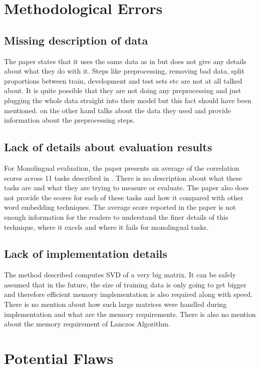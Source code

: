 \documentclass[11pt]{article}
\begin{document}
\section{Methodological Errors}
\subsection{Missing description of data} \label{missingdata}
The paper states that it uses the same data as in \cite{faruqui2014improving} but does not give any details about what they do with it. Steps like preprocessing, removing bad data, split proportions between train, development and test sets etc are not at all talked about. It is quite possible that they are not doing any preprocessing and just plugging the whole data straight into their model but this fact should have been mentioned. \cite{faruqui2014improving} on the other hand talks about the data they used and provide information about the preprocessing steps.

\subsection{Lack of details about evaluation results}
For Monolingual evaluation, the paper presents an average of the correlation scores across 11 tasks described in \cite{faruqui2014community}. There is no description about what these tasks are and what they are trying to measure or evaluate. The paper also does not provide the scores for each of these tasks and how it compared with other word embedding techniques. The average score reported in the paper is not enough information for the readers to understand the finer details of this technique, where it excels and where it fails for monolingual tasks.

\subsection{Lack of implementation details}
The method described computes SVD of a very big matrix. It can be safely assumed that in the future, the size of training data is only going to get bigger and therefore efficient memory implementation is also required along with speed. There is no mention about how such large matrices were handled during implementation and what are the memory requirements. There is also no mention about the memory requirement of Lanczos Algorithm.

\section{Potential Flaws}
\end{document}
